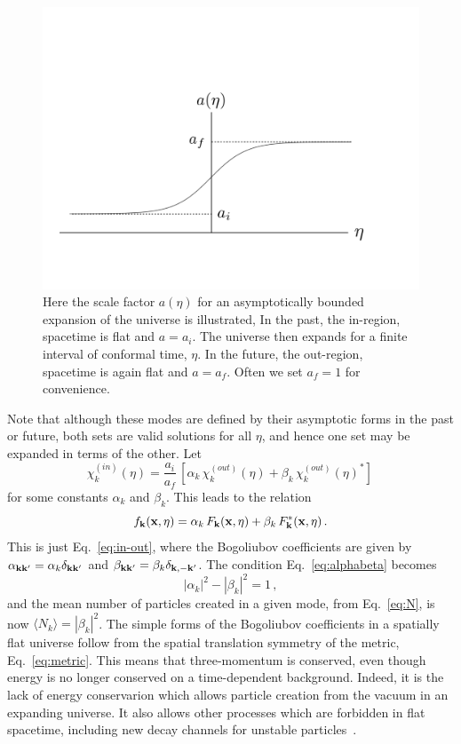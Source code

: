 \documentclass[12pt,onecolumn,eqsecnum,floats,aps,prd,floatfix,titlepage,tightenlines]{revtex4-2}
\begin{document}
\begin{figure}[htbp]
\includegraphics[scale=0.4]{bounded-expansion}
\caption{Here the scale factor $a(\eta)$ for an asymptotically bounded expansion of the universe is illustrated,
In the past, the in-region, spacetime is flat and $a=a_i$. The universe then expands for a finite interval of conformal
time, $\eta$. In the future, the out-region, spacetime is again flat and  $a=a_f$. Often we set $a_f = 1$ for convenience.}
\label{fig:boundedexpansion}
\end{figure}


Note that although these modes are defined by their asymptotic forms in the past or future, both sets are
valid solutions for all $\eta$, and hence one set may be expanded in terms of the other. Let
 \begin{equation}
  \chi_k^{(in)}(\eta) = \frac{a_i}{a_f}\, [\alpha_k\, \chi_k^{(out)}(\eta) + \beta_k\, \chi_k^{(out)}(\eta)^*]\,
  \label{eq:chi-alphabeta}
 \end{equation}
for some constants $\alpha_k$ and $\beta_k$. This leads to the relation
 \begin{equation}
 f_{\bf k}({\bf x},\eta)= \alpha_k\,  F_{\bf k}({\bf x},\eta) + \beta_k \, F^*_{\bf k}({\bf x},\eta) \,.
 \end{equation}
This is just Eq.~\eqref{eq:in-out}, where  the Bogoliubov coefficients are given 
by $\alpha_{\bf k k'} = \alpha_k \delta_{\bf k k'}$ and $\beta_{\bf k k'} = \beta_k \delta_{\bf k, -k'}$.
The condition Eq.~\eqref{eq:alphabeta} becomes
 \begin{equation}
 |\alpha_k|^2 -  |\beta_k|^2 = 1\,,
 \label{eq:alphabeta2}
 \end{equation}
 and the mean number of particles created in a given mode, from Eq.~\eqref{eq:N}, is now $\langle N_k \rangle =  |\beta_k|^2$.
 The simple forms of the Bogoliubov coefficients in a spatially flat universe follow from the spatial
 translation symmetry of the metric, Eq.~\eqref{eq:metric}. This means that three-momentum is conserved,
 even though energy is no longer conserved on a time-dependent background.  Indeed, it is the lack of energy conservarion 
 which allows particle creation from the vacuum in an expanding universe. It also allows other processes which are forbidden
 in flat spacetime, including new decay channels for unstable particles~\cite{Ford82,Lankinen18}. 
 
\end{document}
